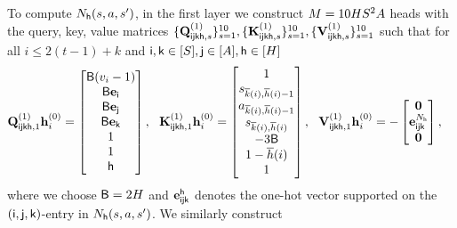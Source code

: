To compute ${N}_{\mathsf{h}}({s},{a},{s}')$, in the first layer we construct ${M}=10{H}{S}^2{A}$ heads with the query, key, value matrices $\{{\mathbf Q}^{(1)}_{{\mathsf{i}}{\mathsf{j}}{\mathsf{k}}{\mathsf{h}},s}\}_{s=1}^{10},\{{\mathbf K}^{(1)}_{{\mathsf{i}}{\mathsf{j}}{\mathsf{k}}{\mathsf{h}},s}\}_{s=1}^{10},\{{\mathbf V}^{(1)}_{{\mathsf{i}}{\mathsf{j}}{\mathsf{k}}{\mathsf{h}},s}\}_{s=1}^{10}$  such that for all $i\leq 2(t-1)+k$ and ${\mathsf{i}},{\mathsf{k}}\in[{S}],{\mathsf{j}}\in[{A}],{\mathsf{h}}\in[{H}]$
\begin{align*}
&{\mathbf Q}^{(1)}_{{\mathsf{i}}{\mathsf{j}}{\mathsf{k}}{\mathsf{h}},1}{\mathbf h}^{(0)}_{i}=
\begin{bmatrix}
{\mathsf{B}}({v}_i-1)\\
        {\mathsf{B}}{\mathbf e}_{\mathsf{i}}\\
         {\mathsf{B}}{\mathbf e}_{\mathsf{j}}\\
          {\mathsf{B}}{\mathbf e}_{\mathsf{k}}\\
          1\\
          1\\
         {\mathsf{h}}
    \end{bmatrix},~~ {\mathbf K}^{(1)}_{{\mathsf{i}}{\mathsf{j}}{\mathsf{k}}{\mathsf{h}},1}{\mathbf h}^{(0)}_{i}=\begin{bmatrix}1\\
     {s}_{\overline{k}(i),\overline{h}(i)-1}\\
        {a}_{\overline{k}(i),\overline{h}(i)-1}\\
         {s}_{\overline{k}(i),\overline{h}(i)}\\
        -3{\mathsf{B}}\\
        1- \overline{h}(i)\\
        1
\end{bmatrix},~~ {\mathbf V}^{(1)}_{{\mathsf{i}}{\mathsf{j}}{\mathsf{k}}{\mathsf{h}},1}{\mathbf h}^{(0)}_{i}=-
\begin{bmatrix}
{\mathbf 0}\\{\mathbf e}^{{N}_{\mathsf{h}}}_{{\mathsf{i}}{\mathsf{j}}{\mathsf{k}}}
\\{\mathbf 0}\end{bmatrix},
\end{align*}
where we choose ${\mathsf{B}}=2{H}$ and ${\mathbf e}_{{\mathsf{i}}{\mathsf{j}}{\mathsf{k}}}^{\mathsf{h}}$ denotes the one-hot vector supported on the $({\mathsf{i}},{\mathsf{j}},{\mathsf{k}})$-entry in ${N}_{\mathsf{h}}({s},{a},{s}')$.
We similarly construct
